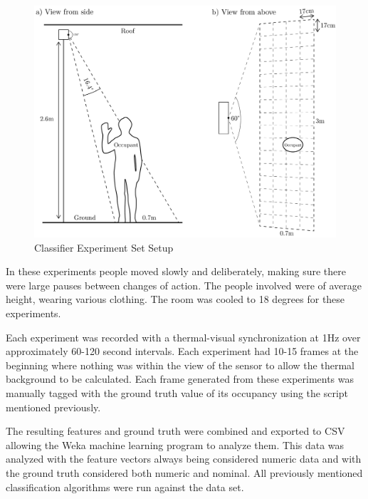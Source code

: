 \documentclass[../thesis/thesis.tex]{subfiles}
\begin{document}
\begin{landscape}
 \begin{figure}
 \centering
 \includegraphics[height=\textheight]{../diagrams/third-exp-setup2.pdf}
 \caption{Classifier Experiment Set Setup}
 \label{fig:exps:3setup}
 \end{figure}
\end{landscape}

In these experiments people moved slowly and deliberately, making sure there were large pauses between changes of action. The people involved were of average height, wearing various clothing. The room was cooled to 18 degrees for these experiments.

Each experiment was recorded with a thermal-visual synchronization at 1Hz over approximately 60-120 second intervals. Each experiment had 10-15 frames at the beginning where nothing was within the view of the sensor to allow the thermal background to be calculated. Each frame generated from these experiments was manually tagged with the ground truth value of its occupancy using the script mentioned previously.

The resulting features and ground truth were combined and exported to CSV allowing the Weka machine learning program to analyze them. This data was analyzed with the feature vectors always being considered numeric data and with the ground truth considered both numeric and nominal. All previously mentioned classification algorithms were run against the data set.

\end{document}
